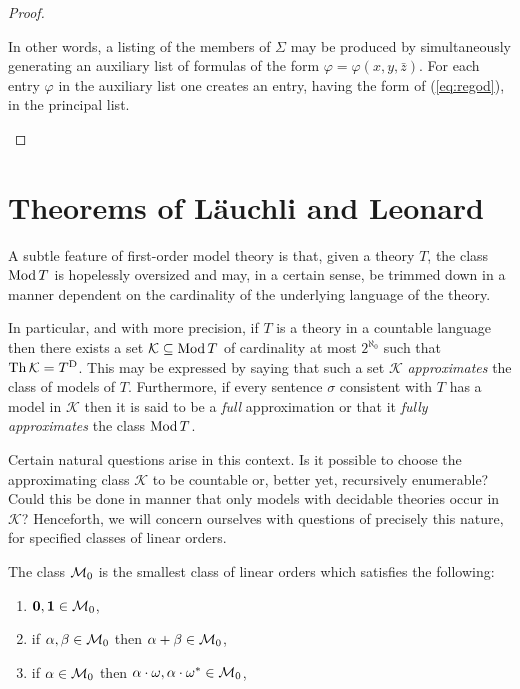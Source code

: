 \begin{prp}
\begin{proof}
\begin{enumerate}
				In other words, a listing of the members of $\Sigma$ may be
				produced by simultaneously generating an auxiliary list of
				formulas of the form $\varphi=\varphi(x,y,\bar{z})$.  For each
				entry $\varphi$ in the auxiliary list one creates an entry,
				having the form of (\ref{eq:regod}), in the principal
				list.\qedhere
		\end{enumerate}
	\end{proof}
\end{prp}


\section{Theorems of L\"auchli and Leonard}

A subtle feature of first-order model theory is that, given a theory $T$, the
class $\operatorname{Mod} T$ is hopelessly oversized and may, in a certain sense, be trimmed
down in a manner dependent on the cardinality of the underlying language of the
theory.

In particular, and with more precision, if $T$ is a theory in a countable
language then there exists a set $\mathcal{K}\subseteq\operatorname{Mod} T$ of cardinality at
most $2^{\aleph_0}$ such that $\operatorname{Th}\mathcal{K}={T}^\mathrm{D}$.  This may be expressed
by saying that such a set $\mathcal{K}$ \textit{approximates} the class of
models of $T$.  Furthermore, if every sentence $\sigma$ consistent with $T$ has
a model in $\mathcal{K}$ then it is said to be a \textit{full} approximation or
that it \textit{fully approximates} the class $\operatorname{Mod} T$.

Certain natural questions arise in this context.  Is it possible to choose the
approximating class $\mathcal{K}$ to be countable or, better yet, recursively
enumerable?  Could this be done in manner that only models with decidable
theories occur in $\mathcal{K}$?  Henceforth, we will concern ourselves with
questions of precisely this nature, for specified classes of linear orders.

\begin{dfn}
	The class $\mathcal{M}_0$ is the smallest class of linear orders which satisfies
	the following:
	\begin{enumerate}
		\item	$\mathbf{0},\mathbf{1}\in\mathcal{M}_0$,
		\item	if $\alpha,\beta\in\mathcal{M}_0$ then $\alpha+\beta\in\mathcal{M}_0$,
		\item	if $\alpha\in\mathcal{M}_0$ then
			$\alpha\cdot\omega,\alpha\cdot{\omega}^\ast\in\mathcal{M}_0$,
	\end{enumerate}
\end{dfn}

